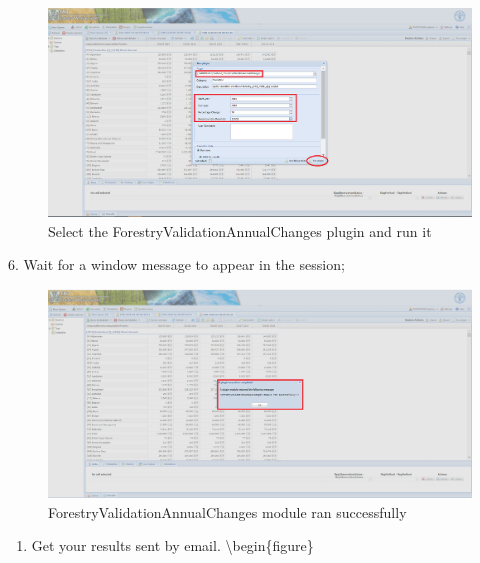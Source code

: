 \documentclass[
]{book}
\providecommand{\tightlist}{%
  \setlength{\itemsep}{0pt}\setlength{\parskip}{0pt}}
\begin{document}
\begin{figure}

{\centering \includegraphics[width=1\linewidth]{images/annual_changes_parameters} 

}

\caption{Select the ForestryValidationAnnualChanges plugin and run it}\label{fig:AnnualChangesPlugin}
\end{figure}

6. Wait for a window message to appear in the session;

\begin{figure}

{\centering \includegraphics[width=1\linewidth]{images/annual_changes_message} 

}

\caption{ForestryValidationAnnualChanges module ran successfully}\label{fig:AnnualChangesPluginResults}
\end{figure}

\begin{enumerate}
\def\labelenumi{\arabic{enumi}.}
\setcounter{enumi}{6}
\tightlist
\item
  Get your results sent by email.
  \textbackslash begin\{figure\}
\end{enumerate}
\end{document}
